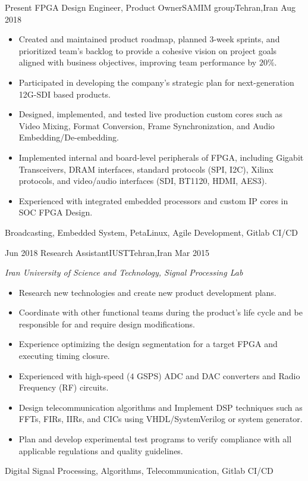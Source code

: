 
\begin{experiences}
  \experience
  {Present} {FPGA Design Engineer, Product Owner}{SAMIM group}{Tehran,Iran}
  {Aug 2018} {
    \begin{itemize}

      \item Created and maintained product roadmap, planned 3-week sprints,
            and prioritized team's backlog to provide a cohesive vision on
            project goals aligned with business objectives, improving team
            performance by $20\%$.
      \item Participated in developing the company's strategic plan for
            next-generation 12G-SDI based products.
      \item Designed, implemented, and tested live production custom cores
            such as Video Mixing, Format Conversion, Frame Synchronization,
            and Audio Embedding/De-embedding.
      \item Implemented internal and board-level peripherals of FPGA, including
            Gigabit Transceivers, DRAM interfaces,
            standard protocols (SPI, I2C), Xilinx protocols, and video/audio
            interfaces (SDI, BT1120, HDMI, AES3).
      \item Experienced with integrated embedded processors and custom IP cores
            in SOC FPGA Design.
    \end{itemize}
  }
  {Broadcasting, Embedded System, PetaLinux, Agile Development, Gitlab CI/CD}

  \emptySeparator

  \experience
  {Jun 2018} {Research Assistant}{IUST}{Tehran,Iran}
  {Mar 2015} {
    \emph{Iran University of Science and Technology, Signal Processing Lab}
    \begin{itemize}
      \item Research new technologies and create new product development plans.
      \item Coordinate with other functional teams during the product's life
            cycle and be responsible for and require design modifications.
      \item Experience optimizing the design segmentation for a target FPGA
            and executing timing closure.
      \item Experienced with high-speed ($4$ GSPS) ADC and DAC converters
            and Radio Frequency (RF) circuits.
      \item Design telecommunication algorithms and Implement DSP techniques
            such as FFTs, FIRs, IIRs, and CICs using VHDL/SystemVerilog
            or system generator.
      \item Plan and develop experimental test programs to verify compliance
            with all applicable regulations and quality guidelines.
    \end{itemize}
  }
  {Digital Signal Processing, Algorithms, Telecommunication, Gitlab CI/CD}


\end{experiences}
